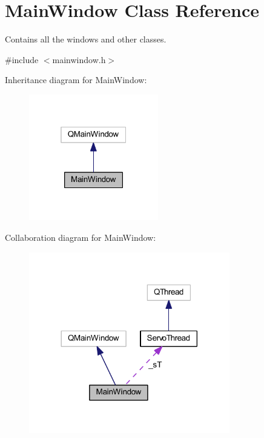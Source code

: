 \hypertarget{class_main_window}{}\section{Main\+Window Class Reference}
\label{class_main_window}


Contains all the windows and other classes.  




{\ttfamily \#include $<$mainwindow.\+h$>$}



Inheritance diagram for Main\+Window\+:\nopagebreak
\begin{figure}[H]
\begin{center}
\leavevmode
\includegraphics[width=160pt]{de/d4b/class_main_window__inherit__graph}
\end{center}
\end{figure}


Collaboration diagram for Main\+Window\+:\nopagebreak
\begin{figure}[H]
\begin{center}
\leavevmode
\includegraphics[width=248pt]{d0/db8/class_main_window__coll__graph}
\end{center}
\end{figure}

